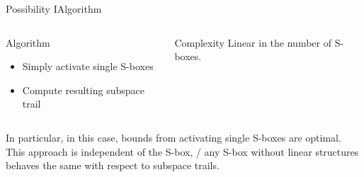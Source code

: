 \begin{frame}{Possibility I}{Algorithm}
    \begin{columns}[t,onlytextwidth]
        \begin{column}{0.5\textwidth}
            \begin{block}{Algorithm}
                \begin{itemize}
                    \item Simply activate single S-boxes
                    \item Compute resulting subspace trail
                \end{itemize}
            \end{block}
        \end{column}
        \begin{column}{0.4\textwidth}
            \begin{block}{Complexity}
                \vspace{0.575em}
                Linear in the number of S-boxes.
                \vspace{0.575em}
            \end{block}
        \end{column}
    \end{columns}
    \vspace{0.5em}
    In particular, in this case, bounds from activating single S-boxes are optimal.\\[1em]
    This approach is independent of the S-box, \ie/ any S-box without linear structures behaves the same with respect to subspace trails.
\end{frame}

